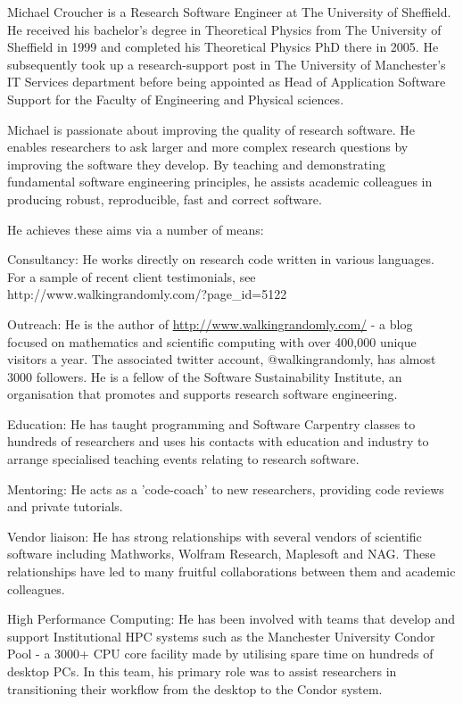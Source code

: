 \begin{participant}[type=R, PM=6, salary=7500]
Michael Croucher is a Research Software Engineer at The University of Sheffield. He received his bachelor's degree in Theoretical Physics from The University of Sheffield in 1999 and completed his Theoretical Physics PhD there in 2005. He subsequently took up a research-support post in The University of Manchester's IT Services department before being appointed as Head of Application Software Support for the Faculty of Engineering and Physical sciences.
 
Michael is passionate about improving the quality of research software. He enables researchers to ask larger and more complex research questions by improving the software they develop. By teaching and demonstrating fundamental software engineering principles, he assists academic colleagues in producing robust, reproducible, fast and correct software.
 
He achieves these aims via a number of means:
 
Consultancy: He works directly on research code written in various languages. For a sample of recent client testimonials, see http://www.walkingrandomly.com/?page_id=5122
 
Outreach: He is the author of \url{http://www.walkingrandomly.com/} - a blog focused on mathematics and scientific computing with over 400,000 unique visitors a year. The associated twitter account, @walkingrandomly, has almost 3000 followers.  He is a fellow of the Software Sustainability Institute, an organisation that promotes and supports research software engineering.
 
Education: He has taught programming and Software Carpentry classes to hundreds of researchers and uses his contacts with education and industry to arrange specialised teaching events relating to research software.
 
Mentoring: He acts as a 'code-coach' to new researchers, providing code reviews and private tutorials.
 
Vendor liaison: He has strong relationships with several vendors of scientific software including Mathworks, Wolfram Research, Maplesoft and NAG. These relationships have led to many fruitful collaborations between them and academic colleagues.
 
High Performance Computing: He has been involved with teams that develop and support Institutional HPC systems such as the Manchester University Condor Pool - a 3000+ CPU core facility made by utilising spare time on hundreds of desktop PCs. In this team, his primary role was to assist researchers in transitioning their workflow from the desktop to the Condor system.
\end{participant}
